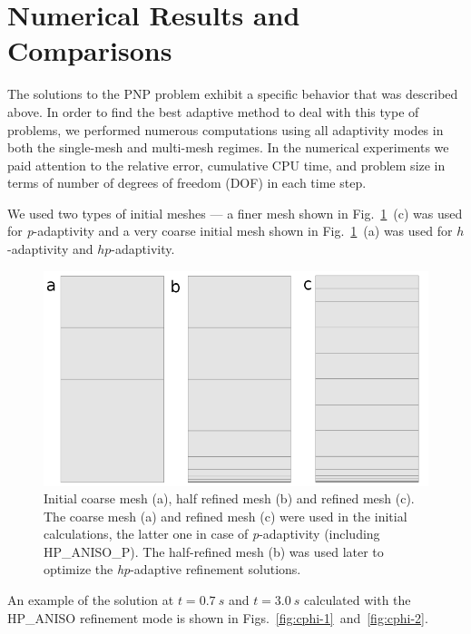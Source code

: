 \section{Numerical Results and Comparisons}\label{sec:results}


The solutions to the PNP problem exhibit a specific behavior that was 
described above. In order to find the best adaptive method to deal with 
this type of problems, we performed numerous computations using all 
adaptivity modes in both the single-mesh and multi-mesh regimes.
In the numerical experiments we paid attention to the 
relative error, cumulative CPU time, and problem size 
in terms of number of degrees of freedom (DOF) in each 
time step. 

We used two types of initial meshes --- a finer mesh shown 
in Fig.~\ref{fig:mesh}~(c) was used for \emph{p}-adaptivity
and a very coarse initial mesh shown in  Fig.~\ref{fig:mesh}~(a) was 
used for $h$-adaptivity and $hp$-adaptivity.

\begin{figure}[!ht]
  \begin{centering}
  \includegraphics[width=.8\columnwidth]{mesh}
  \caption{\label{fig:mesh} Initial coarse mesh (a),
  	half refined mesh (b) and refined mesh (c). The coarse mesh (a)
	and refined mesh (c) were used in the initial calculations, the latter one
	in case of \emph{p}-adaptivity (including HP\_ANISO\_P). The half-refined mesh (b) was
	used later to optimize the \emph{hp}-adaptive refinement solutions.}
  \end{centering}
\end{figure}

An example of the solution at $t=0.7\ s$ and $t=3.0\ s$ 
calculated with the HP\_ANISO refinement mode is shown
in Figs.~\ref{fig:cphi-1}~and~\ref{fig:cphi-2}. 


